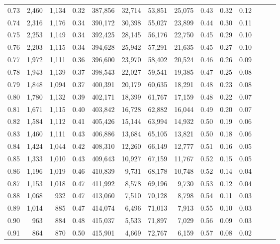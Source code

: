 \begin{tabular}{rrrrrrrrrrrrrr}
0.73 &  2,460 &  1,134 &  0.32 &  387,856 &   32,714 &  53,851 &  25,075 &  0.43 &  0.32 &      0.12 \\
0.74 &  2,316 &  1,176 &  0.34 &  390,172 &   30,398 &  55,027 &  23,899 &  0.44 &  0.30 &      0.11 \\
0.75 &  2,253 &  1,149 &  0.34 &  392,425 &   28,145 &  56,176 &  22,750 &  0.45 &  0.29 &      0.10 \\
0.76 &  2,203 &  1,115 &  0.34 &  394,628 &   25,942 &  57,291 &  21,635 &  0.45 &  0.27 &      0.10 \\
0.77 &  1,972 &  1,111 &  0.36 &  396,600 &   23,970 &  58,402 &  20,524 &  0.46 &  0.26 &      0.09 \\
0.78 &  1,943 &  1,139 &  0.37 &  398,543 &   22,027 &  59,541 &  19,385 &  0.47 &  0.25 &      0.08 \\
0.79 &  1,848 &  1,094 &  0.37 &  400,391 &   20,179 &  60,635 &  18,291 &  0.48 &  0.23 &      0.08 \\
0.80 &  1,780 &  1,132 &  0.39 &  402,171 &   18,399 &  61,767 &  17,159 &  0.48 &  0.22 &      0.07 \\
0.81 &  1,671 &  1,115 &  0.40 &  403,842 &   16,728 &  62,882 &  16,044 &  0.49 &  0.20 &      0.07 \\
0.82 &  1,584 &  1,112 &  0.41 &  405,426 &   15,144 &  63,994 &  14,932 &  0.50 &  0.19 &      0.06 \\
0.83 &  1,460 &  1,111 &  0.43 &  406,886 &   13,684 &  65,105 &  13,821 &  0.50 &  0.18 &      0.06 \\
0.84 &  1,424 &  1,044 &  0.42 &  408,310 &   12,260 &  66,149 &  12,777 &  0.51 &  0.16 &      0.05 \\
0.85 &  1,333 &  1,010 &  0.43 &  409,643 &   10,927 &  67,159 &  11,767 &  0.52 &  0.15 &      0.05 \\
0.86 &  1,196 &  1,019 &  0.46 &  410,839 &    9,731 &  68,178 &  10,748 &  0.52 &  0.14 &      0.04 \\
0.87 &  1,153 &  1,018 &  0.47 &  411,992 &    8,578 &  69,196 &   9,730 &  0.53 &  0.12 &      0.04 \\
0.88 &  1,068 &    932 &  0.47 &  413,060 &    7,510 &  70,128 &   8,798 &  0.54 &  0.11 &      0.03 \\
0.89 &  1,014 &    885 &  0.47 &  414,074 &    6,496 &  71,013 &   7,913 &  0.55 &  0.10 &      0.03 \\
0.90 &    963 &    884 &  0.48 &  415,037 &    5,533 &  71,897 &   7,029 &  0.56 &  0.09 &      0.03 \\
0.91 &    864 &    870 &  0.50 &  415,901 &    4,669 &  72,767 &   6,159 &  0.57 &  0.08 &      0.02 \\

\end{tabular}
